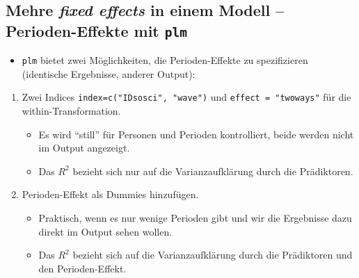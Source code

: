 \documentclass[]{book}
\newenvironment{Shaded}{\begin{snugshade}}{\end{snugshade}}
\newcommand{\DataTypeTok}[1]{\textcolor[rgb]{0.13,0.29,0.53}{#1}}
\newcommand{\KeywordTok}[1]{\textcolor[rgb]{0.13,0.29,0.53}{\textbf{#1}}}
\newcommand{\NormalTok}[1]{#1}
\newcommand{\OperatorTok}[1]{\textcolor[rgb]{0.81,0.36,0.00}{\textbf{#1}}}
\newcommand{\StringTok}[1]{\textcolor[rgb]{0.31,0.60,0.02}{#1}}
\providecommand{\tightlist}{%
  \setlength{\itemsep}{0pt}\setlength{\parskip}{0pt}}
\begin{document}
\hypertarget{mehre-fixed-effects-in-einem-modell-perioden-effekte-mit-plm}{%
\subsection{\texorpdfstring{Mehre \emph{fixed effects} in einem Modell -- Perioden-Effekte mit \texttt{plm}}{Mehre fixed effects in einem Modell -- Perioden-Effekte mit plm}}\label{mehre-fixed-effects-in-einem-modell-perioden-effekte-mit-plm}}

\begin{itemize}
\tightlist
\item
  \texttt{plm} bietet zwei Möglichkeiten, die Perioden-Effekte zu spezifizieren (identische Ergebnisse, anderer Output):
\end{itemize}

\begin{enumerate}
\def\labelenumi{\arabic{enumi})}
\tightlist
\item
  Zwei Indices \texttt{index=c("IDsosci",\ "wave")} und \texttt{effect\ =\ "twoways"} für die within-Transformation.

  \begin{itemize}
  \tightlist
  \item
    Es wird ``still'' für Personen und Perioden kontrolliert, beide werden nicht im Output angezeigt.
  \item
    Das \(R^2\) bezieht sich nur auf die Varianzaufklärung durch die Prädiktoren.
  \end{itemize}
\item
  Perioden-Effekt als Dummies hinzufügen.

  \begin{itemize}
  \tightlist
  \item
    Praktisch, wenn es nur wenige Perioden gibt und wir die Ergebnisse dazu direkt im Output sehen wollen.
  \item
    Das \(R^2\) bezieht sich auf die Varianzaufklärung durch die Prädiktoren und den Perioden-Effekt.
  \end{itemize}
\end{enumerate}

\begin{Shaded}
\end{Shaded}
\end{document}
